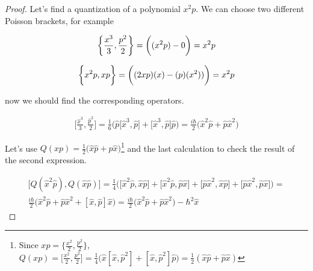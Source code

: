 \begin{proof}
    Let's find a quantization of a polynomial $x^{2} p$. We can choose two different Poisson brackets, for example

    \begin{equation}
        \bigg\{\frac{x^{3}}{3}, \frac{p^{2}}{2}\bigg\} = \bigg((x^{2} p) - 0\bigg) = x^{2} p \\
    \end{equation}

    \begin{equation}
        \bigg\{x^{2} p, x p\bigg\} = \bigg((2 x p) (x) - (p) (x^{2}))\bigg) = x^{2} p \\
    \end{equation}

    now we should find the corresponding operators.

    \begin{equation*}
        \begin{gathered}
            \bigg[\frac{\hat{x}^{3}}{3}, \frac{\hat{p}^{2}}{2}\bigg] = \frac{1}{6} \bigg(\hat{p} \big[\hat{x}^{3}, \hat{p}\big] + \big[\hat{x}^{3}, \hat{p}\big] \hat{p}\bigg) = 
            \frac{i\hbar}{2} \big(\hat{x}^{2} \hat{p} + \hat{p}\hat{x}^{2}\big)
        \end{gathered}
    \end{equation*}

    Let's use $Q (xp) = \frac{1}{2}\big(\hat{x} \hat{p} + \hat{p} \hat{x}\big)$\footnote{Since $xp = \big\{\frac{x^{2}}{2}, \frac{p^{2}}{2} \big\}$, $Q(xp) = 
    \big[\frac{x^{2}}{2}, \frac{p^{2}}{2} \big] = \frac{1}{4} \big(\hat{x} [\hat{x}, \hat{p}^{2}] + [\hat{x}, \hat{p}^{2}] \hat{p}\big) = \frac{1}{2} (\hat{x} \hat{p} + \hat{p} \hat{x})$} and
    the last calculation to check the result of the second expression.

    \begin{equation*}
        \begin{gathered}
            \bigg[Q(\hat{x}^{2} \hat{p}), Q(\hat{x} \hat{p})\bigg] = \frac{1}{4} \bigg( \big[\hat{x}^{2}\hat{p}, \hat{x}\hat{p}\big] + \big[\hat{x}^{2}\hat{p}, \hat{p}\hat{x}\big] + \big[\hat{p}\hat{x}^{2}, \hat{x}\hat{p}\big] + \big[\hat{p}\hat{x}^{2}, \hat{p}\hat{x}\big] \bigg) = \\
            \frac{i \hbar}{2} \bigg(\hat{x}^{2}\hat{p} + \hat{p}\hat{x}^{2} + [\hat{x}, \hat{p}] \hat{x}\bigg) = \frac{i \hbar}{2} \bigg(\hat{x}^{2}\hat{p} + \hat{p}\hat{x}^{2}\bigg) - \hbar^{2} \hat{x}
        \end{gathered}
    \end{equation*}


\end{proof}
